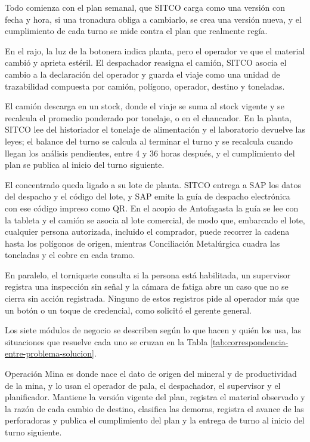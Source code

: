 \documentclass[subdoc]{../../comun/overfore}
\begin{document}
Todo comienza con el plan semanal, que SITCO carga como una versión con fecha y hora, si una tronadura obliga a cambiarlo, se crea una versión nueva, y el cumplimiento de cada turno se mide contra el plan que realmente regía.

En el rajo, la luz de la botonera indica planta, pero el operador ve que el material cambió y aprieta estéril. El despachador reasigna el camión, SITCO asocia el cambio a la declaración del operador y guarda el viaje como una unidad de trazabilidad compuesta por camión, polígono, operador, destino y toneladas.

El camión descarga en un stock, donde el viaje se suma al stock vigente y se recalcula el promedio ponderado por tonelaje, o en el chancador. En la planta, SITCO lee del historiador el tonelaje de alimentación y el laboratorio devuelve las leyes; el balance del turno se calcula al terminar el turno y se recalcula cuando llegan los análisis pendientes, entre 4 y 36 horas después, y el cumplimiento del plan se publica al inicio del turno siguiente.

El concentrado queda ligado a su lote de planta. SITCO entrega a SAP los datos del despacho y el código del lote, y SAP emite la guía de despacho electrónica con ese código impreso como QR. En el acopio de Antofagasta la guía se lee con la tableta y el camión se asocia al lote comercial, de modo que, embarcado el lote, cualquier persona autorizada, incluido el comprador, puede recorrer la cadena hasta los polígonos de origen, mientras Conciliación Metalúrgica cuadra las toneladas y el cobre en cada tramo.

En paralelo, el torniquete consulta si la persona está habilitada, un supervisor registra una inspección sin señal y la cámara de fatiga abre un caso que no se cierra sin acción registrada. Ninguno de estos registros pide al operador más que un botón o un toque de credencial, como solicitó el gerente general.

Los siete módulos de negocio se describen según lo que hacen y quién los usa, las situaciones que resuelve cada uno se cruzan en la Tabla \ref{tab:correspondencia-entre-problema-solucion}.

Operación Mina es donde nace el dato de origen del mineral y de productividad de la mina, y lo usan el operador de pala, el despachador, el supervisor y el planificador. Mantiene la versión vigente del plan, registra el material observado y la razón de cada cambio de destino, clasifica las demoras, registra el avance de las perforadoras y publica el cumplimiento del plan y la entrega de turno al inicio del turno siguiente.
\end{document}

